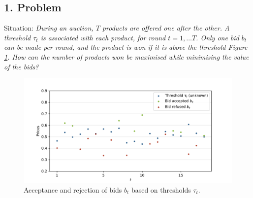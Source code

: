 \documentclass[
	landscape, %
]{ImperialPoster}
\begin{document}

\titlesection %

\medskip %

\begin{multicols}{4} %
	
	
	\subsection{1. Problem}
	\textcolor{ICLBlue}{Situation:} \textit{During an auction, $T$ products are offered one after the other. A \textcolor{ICLBlue}{threshold} $\tau_t$ is associated with each product, for round $t = 1, \dots T$. 
	Only one \textcolor{ICLBlue}{bid} $b_t$ can be made per round, and the product is won if it is above the threshold Figure \ref{fig:bid_threshold}. How can the number of products won be maximised while minimising the value of the bids?}\\
	\begin{figure}[H] %
		\includegraphics[width=\linewidth]{"../../../../figures/bid_threshold.pdf"} %
		\caption{Acceptance and rejection of bids $b_t$ based on thresholds $\tau_t$.}
		\label{fig:bid_threshold}
	\end{figure}
	\begin{itemize}

\end{itemize}
\end{multicols}
\end{document}
